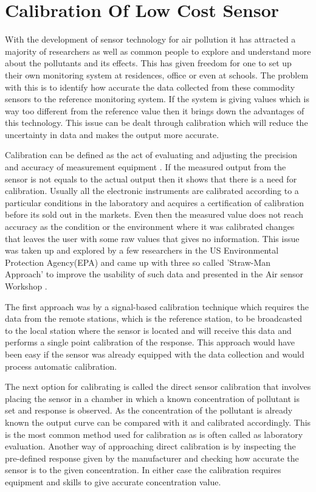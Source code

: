 \documentclass[12pt,a4paper,oneside]{report}
\begin{document}
\section*{Calibration Of Low Cost Sensor}

With the development of sensor technology for air pollution it has attracted a majority of researchers as well as common people to explore and understand more about the pollutants and its effects. This has given freedom for one to set up their own monitoring system at residences, office or even at schools. The problem with this is to identify how accurate the data collected from these commodity sensors to the reference monitoring system. If the system is giving values which is way too different from the reference value then it brings down the advantages of this technology. This issue can be dealt through calibration which will reduce the uncertainty in data and makes the output more accurate. 
\par 
Calibration can be defined as the act of evaluating and adjusting the precision and accuracy of measurement equipment \cite{Kejuruteraan2018}. If the measured output from the sensor is not equals to the actual output then it shows that there is a need for calibration. Usually all the electronic instruments are calibrated according to a particular conditions in the laboratory and acquires a certification of calibration before its sold out in the markets. Even then the measured value does not reach accuracy as the condition or the environment where it was calibrated changes that leaves the user with some raw values that gives no information. This issue was taken up and explored by a few researchers in the US Environmental Protection Agency(EPA) and came up with three so called 'Straw-Man Approach' to improve the usability of such data and presented in the Air sensor Workshop \cite{Williams2013}. 

The first approach was by a signal-based calibration technique which requires the data from the remote stations, which is the reference station, to be broadcasted to the local station where the sensor is located and will receive this data and performs a single point calibration of the response. This approach would have been easy if the sensor was already equipped with the data collection and would process automatic calibration. 

The next option for calibrating is called the direct sensor calibration that involves placing the sensor in a chamber in which a known concentration of pollutant is set and response is observed. As the concentration of the pollutant is already known the output curve can be compared with it and calibrated accordingly. This is the most common method used for calibration as is often called as laboratory evaluation. Another way of approaching direct calibration is by inspecting the pre-defined response given by the manufacturer and checking how accurate the sensor is to the given concentration. In either case the calibration requires equipment and skills to give accurate concentration value.
\end{document}
